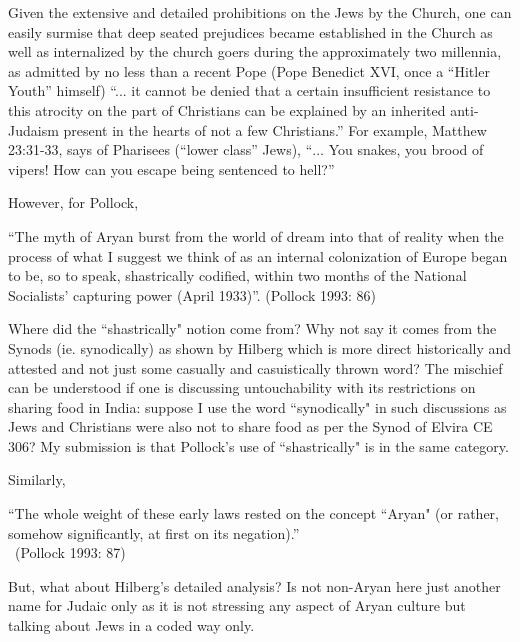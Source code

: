 Given the extensive and detailed prohibitions on the Jews by the Church, one can easily surmise that deep seated prejudices became established in the Church as well as internalized by the church goers during the approximately two millennia, as admitted by no less than a recent Pope (Pope Benedict XVI, once a ``Hitler Youth'' himself) “... it cannot be denied that a certain insufficient resistance to this atrocity on the part of Christians can be explained by an inherited anti-Judaism present in the hearts of not a few Christians.” For example, Matthew 23:31-33, says of Pharisees (“lower class” Jews), “$\ldots$ You snakes, you brood of vipers! How can you escape being sentenced to hell?”

However, for Pollock, 
\begin{myquote}
“The myth of Aryan burst from the world of dream into that of reality when the process of what I suggest we think of as an internal colonization of Europe began to be, so to speak, shastrically codified, within two months of the National Socialists' capturing power (April 1933)”. 	\hfill (Pollock 1993: 86)
\end{myquote}

Where did the ``shastrically" notion come from? Why not say it comes from the Synods (ie. synodically) as shown by Hilberg which is more direct historically and attested and not just some casually and casuistically thrown word? The mischief can be understood if one is discussing untouchability with its restrictions on sharing food in India: suppose I use the word ``synodically" in such discussions as Jews and Christians were also not to share food as per the Synod of Elvira CE 306? My submission is that Pollock's use of ``shastrically" is in the same category.

Similarly, 
\begin{myquote}
``The whole weight of these early laws rested on the concept ``Aryan" (or rather, somehow significantly, at first on its negation).”\\[-15pt]

~\hfill(Pollock 1993: 87)
\end{myquote}

But, what about Hilberg's detailed analysis? Is not non-Aryan here just another name for Judaic only as it is not stressing any aspect of Aryan culture but talking about Jews in a coded way only.


